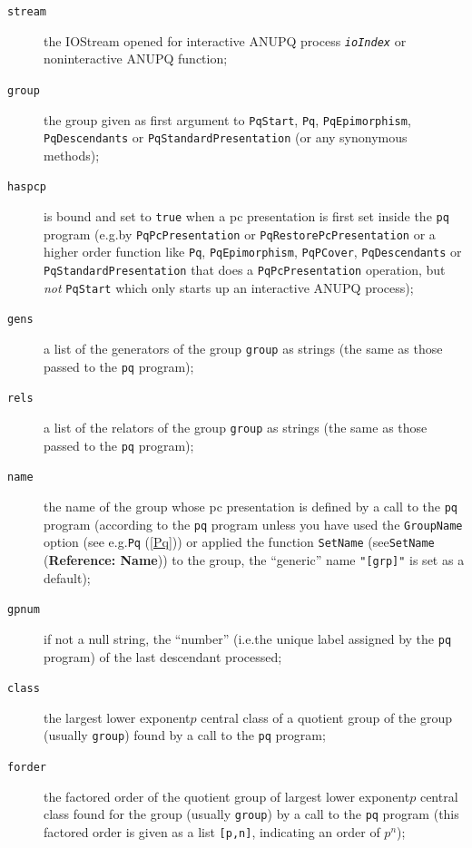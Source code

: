 \documentclass[a4paper,11pt]{report}
\begin{document}
{{{\begin{description}
\item[{\texttt{stream}}]  the IOStream opened for interactive \textsf{ANUPQ} process \mbox{\texttt{\mdseries\slshape ioIndex}} or non\texttt{}interactive \textsf{ANUPQ} function; 
\item[{\texttt{group}}]  the group given as first argument to \texttt{PqStart}, \texttt{Pq}, \texttt{PqEpimorphism}, \texttt{PqDescendants} or \texttt{PqStandardPresentation} (or any synonymous methods); 
\item[{\texttt{haspcp}}]  is bound and set to \texttt{true} when a pc presentation is first set inside the \texttt{pq} program (e.g.{\nobreakspace}by \texttt{PqPcPresentation} or \texttt{PqRestorePcPresentation} or a higher order function like \texttt{Pq}, \texttt{PqEpimorphism}, \texttt{PqPCover}, \texttt{PqDescendants} or \texttt{PqStandardPresentation} that does a \texttt{PqPcPresentation} operation, but \emph{not} \texttt{PqStart} which only starts up an interactive \textsf{ANUPQ} process); 
\item[{\texttt{gens}}]  a list of the generators of the group \texttt{group} as strings (the same as those passed to the \texttt{pq} program); 
\item[{\texttt{rels}}]  a list of the relators of the group \texttt{group} as strings (the same as those passed to the \texttt{pq} program); 
\item[{\texttt{name}}]  the name of the group whose pc presentation is defined by a call to the \texttt{pq} program (according to the \texttt{pq} program \texttt{}\texttt{} unless you have used the \texttt{GroupName} option (see e.g.{\nobreakspace}\texttt{Pq} (\ref{Pq})) or applied the function \texttt{SetName} (see{\nobreakspace}\texttt{SetName} (\textbf{Reference: Name})) to the group, the ``generic'' name \texttt{"[grp]"} is set as a default); 
\item[{\texttt{gpnum}}]  if not a null string, the ``number'' (i.e.{\nobreakspace}the unique label assigned by the \texttt{pq} program) of the last descendant processed; 
\item[{\texttt{class}}]  the largest lower exponent\texttt{}$p$ central class of a quotient group of the group (usually \texttt{group}) found by a call to the \texttt{pq} program; 
\item[{\texttt{forder}}]  the factored order of the quotient group of largest lower
exponent\texttt{}$p$ central class found for the group (usually \texttt{group}) by a call to the \texttt{pq} program (this factored order is given as a list  \texttt{[p,n]}, indicating an order of $p^n$); 

\end{description}}}}
\end{document}
